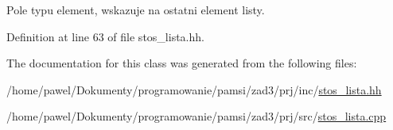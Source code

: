 Pole typu element, wskazuje na ostatni element listy. 



Definition at line 63 of file stos\-\_\-lista.\-hh.



The documentation for this class was generated from the following files\-:\begin{DoxyCompactItemize}
\item 
/home/pawel/\-Dokumenty/programowanie/pamsi/zad3/prj/inc/\hyperlink{stos__lista_8hh}{stos\-\_\-lista.\-hh}\item 
/home/pawel/\-Dokumenty/programowanie/pamsi/zad3/prj/src/\hyperlink{stos__lista_8cpp}{stos\-\_\-lista.\-cpp}\end{DoxyCompactItemize}
